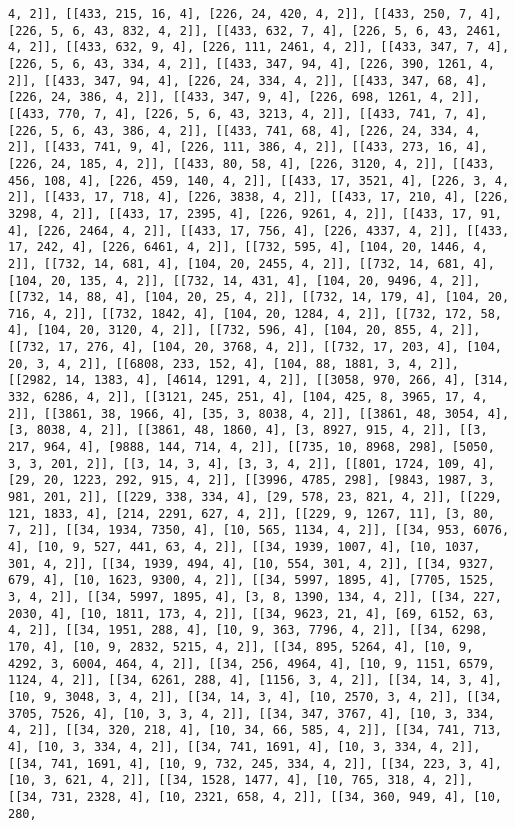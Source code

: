 \documentclass[12pt,fleqn]{article}\usepackage{../../common}
\begin{document}
\begin{verbatim}
4, 2]], [[433, 215, 16, 4], [226, 24, 420, 4, 2]], [[433, 250, 7, 4], [226, 5, 6, 43, 832, 4, 2]], [[433, 632, 7, 4], [226, 5, 6, 43, 2461, 4, 2]], [[433, 632, 9, 4], [226, 111, 2461, 4, 2]], [[433, 347, 7, 4], [226, 5, 6, 43, 334, 4, 2]], [[433, 347, 94, 4], [226, 390, 1261, 4, 2]], [[433, 347, 94, 4], [226, 24, 334, 4, 2]], [[433, 347, 68, 4], [226, 24, 386, 4, 2]], [[433, 347, 9, 4], [226, 698, 1261, 4, 2]], [[433, 770, 7, 4], [226, 5, 6, 43, 3213, 4, 2]], [[433, 741, 7, 4], [226, 5, 6, 43, 386, 4, 2]], [[433, 741, 68, 4], [226, 24, 334, 4, 2]], [[433, 741, 9, 4], [226, 111, 386, 4, 2]], [[433, 273, 16, 4], [226, 24, 185, 4, 2]], [[433, 80, 58, 4], [226, 3120, 4, 2]], [[433, 456, 108, 4], [226, 459, 140, 4, 2]], [[433, 17, 3521, 4], [226, 3, 4, 2]], [[433, 17, 718, 4], [226, 3838, 4, 2]], [[433, 17, 210, 4], [226, 3298, 4, 2]], [[433, 17, 2395, 4], [226, 9261, 4, 2]], [[433, 17, 91, 4], [226, 2464, 4, 2]], [[433, 17, 756, 4], [226, 4337, 4, 2]], [[433, 17, 242, 4], [226, 6461, 4, 2]], [[732, 595, 4], [104, 20, 1446, 4, 2]], [[732, 14, 681, 4], [104, 20, 2455, 4, 2]], [[732, 14, 681, 4], [104, 20, 135, 4, 2]], [[732, 14, 431, 4], [104, 20, 9496, 4, 2]], [[732, 14, 88, 4], [104, 20, 25, 4, 2]], [[732, 14, 179, 4], [104, 20, 716, 4, 2]], [[732, 1842, 4], [104, 20, 1284, 4, 2]], [[732, 172, 58, 4], [104, 20, 3120, 4, 2]], [[732, 596, 4], [104, 20, 855, 4, 2]], [[732, 17, 276, 4], [104, 20, 3768, 4, 2]], [[732, 17, 203, 4], [104, 20, 3, 4, 2]], [[6808, 233, 152, 4], [104, 88, 1881, 3, 4, 2]], [[2982, 14, 1383, 4], [4614, 1291, 4, 2]], [[3058, 970, 266, 4], [314, 332, 6286, 4, 2]], [[3121, 245, 251, 4], [104, 425, 8, 3965, 17, 4, 2]], [[3861, 38, 1966, 4], [35, 3, 8038, 4, 2]], [[3861, 48, 3054, 4], [3, 8038, 4, 2]], [[3861, 48, 1860, 4], [3, 8927, 915, 4, 2]], [[3, 217, 964, 4], [9888, 144, 714, 4, 2]], [[735, 10, 8968, 298], [5050, 3, 3, 201, 2]], [[3, 14, 3, 4], [3, 3, 4, 2]], [[801, 1724, 109, 4], [29, 20, 1223, 292, 915, 4, 2]], [[3996, 4785, 298], [9843, 1987, 3, 981, 201, 2]], [[229, 338, 334, 4], [29, 578, 23, 821, 4, 2]], [[229, 121, 1833, 4], [214, 2291, 627, 4, 2]], [[229, 9, 1267, 11], [3, 80, 7, 2]], [[34, 1934, 7350, 4], [10, 565, 1134, 4, 2]], [[34, 953, 6076, 4], [10, 9, 527, 441, 63, 4, 2]], [[34, 1939, 1007, 4], [10, 1037, 301, 4, 2]], [[34, 1939, 494, 4], [10, 554, 301, 4, 2]], [[34, 9327, 679, 4], [10, 1623, 9300, 4, 2]], [[34, 5997, 1895, 4], [7705, 1525, 3, 4, 2]], [[34, 5997, 1895, 4], [3, 8, 1390, 134, 4, 2]], [[34, 227, 2030, 4], [10, 1811, 173, 4, 2]], [[34, 9623, 21, 4], [69, 6152, 63, 4, 2]], [[34, 1951, 288, 4], [10, 9, 363, 7796, 4, 2]], [[34, 6298, 170, 4], [10, 9, 2832, 5215, 4, 2]], [[34, 895, 5264, 4], [10, 9, 4292, 3, 6004, 464, 4, 2]], [[34, 256, 4964, 4], [10, 9, 1151, 6579, 1124, 4, 2]], [[34, 6261, 288, 4], [1156, 3, 4, 2]], [[34, 14, 3, 4], [10, 9, 3048, 3, 4, 2]], [[34, 14, 3, 4], [10, 2570, 3, 4, 2]], [[34, 3705, 7526, 4], [10, 3, 3, 4, 2]], [[34, 347, 3767, 4], [10, 3, 334, 4, 2]], [[34, 320, 218, 4], [10, 34, 66, 585, 4, 2]], [[34, 741, 713, 4], [10, 3, 334, 4, 2]], [[34, 741, 1691, 4], [10, 3, 334, 4, 2]], [[34, 741, 1691, 4], [10, 9, 732, 245, 334, 4, 2]], [[34, 223, 3, 4], [10, 3, 621, 4, 2]], [[34, 1528, 1477, 4], [10, 765, 318, 4, 2]], [[34, 731, 2328, 4], [10, 2321, 658, 4, 2]], [[34, 360, 949, 4], [10, 280, 
\end{verbatim}
\end{document}
